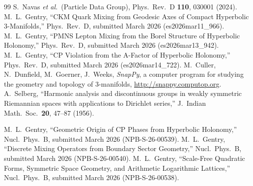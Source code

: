 \documentclass[a4paper,11pt]{article}
\begin{document}
\begin{thebibliography}{99}
  S.~Navas \textit{et al.}\ (Particle Data Group),
  Phys.\ Rev.\ D \textbf{110}, 030001 (2024).
  M.~L.~Gentry,
  ``CKM Quark Mixing from Geodesic Axes of Compact Hyperbolic 3-Manifolds,''
  Phys.\ Rev.\ D, submitted March 2026 (es2026mar11\_966).
  M.~L.~Gentry,
  ``PMNS Lepton Mixing from the Borel Structure of Hyperbolic Holonomy,''
  Phys.\ Rev.\ D, submitted March 2026 (es2026mar13\_942).
  M.~L.~Gentry,
  ``CP Violation from the A-Factor of Hyperbolic Holonomy,''
  Phys.\ Rev.\ D, submitted March 2026 (es2026mar14\_722).
  M.~Culler, N.~Dunfield, M.~Goerner, J.~Weeks,
  \textit{SnapPy}, a computer program for studying the geometry and topology
  of 3-manifolds, \url{http://snappy.computop.org}.
  A.~Selberg,
  ``Harmonic analysis and discontinuous groups in weakly symmetric Riemannian
  spaces with applications to Dirichlet series,''
  J.\ Indian Math.\ Soc.\ \textbf{20}, 47--87 (1956).

  M.~L.~Gentry,
  ``Geometric Origin of CP Phases from Hyperbolic Holonomy,''
  Nucl.\ Phys.\ B, submitted March 2026 (NPB-S-26-00539).
  M.~L.~Gentry,
  ``Discrete Mixing Operators from Boundary Sector Geometry,''
  Nucl.\ Phys.\ B, submitted March 2026 (NPB-S-26-00540).
  M.~L.~Gentry,
  ``Scale-Free Quadratic Forms, Symmetric Space Geometry, and Arithmetic
  Logarithmic Lattices,''
  Nucl.\ Phys.\ B, submitted March 2026 (NPB-S-26-00538).
\end{thebibliography}
\end{document}
